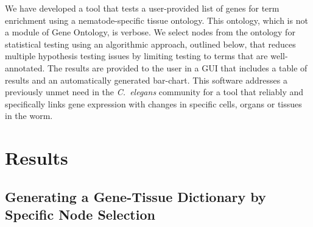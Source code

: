 We have developed a tool that tests a user-provided list of genes for term
enrichment using a nematode-specific tissue ontology. This ontology, which is
not a module of Gene Ontology, is verbose. We select nodes from the ontology for
statistical testing using an algorithmic approach, outlined below, that reduces
multiple hypothesis testing issues by limiting testing to terms that are
well-annotated. The results are provided to the user in a GUI that includes a
table of results and an automatically generated bar-chart. This software
addresses a previously unmet need in the \emph{C.~elegans} community for a tool
that reliably and specifically links gene expression with changes in specific
cells, organs or tissues in the worm.

\section*{Results}
\subsection*{Generating a Gene-Tissue Dictionary by Specific Node Selection}
